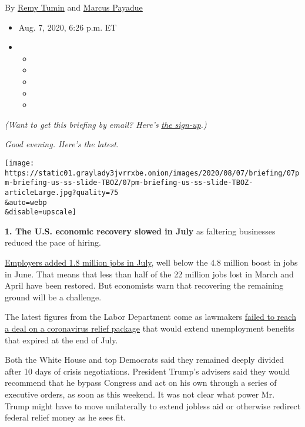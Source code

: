 By \href{https://www.nytimes3xbfgragh.onion/by/remy-tumin}{Remy Tumin}
and \href{https://www.nytimes3xbfgragh.onion/by/marcus-payadue}{Marcus
Payadue}

\begin{itemize}
\item
  Aug. 7, 2020, 6:26 p.m. ET
\item
  \begin{itemize}
  \item
  \item
  \item
  \item
  \item
  \end{itemize}
\end{itemize}

\emph{(Want to get this briefing by email? Here's}
\href{http://www.nytimes3xbfgragh.onion/newsletters/nyt-now-evening-briefing?module=inline}{\emph{the
sign-up}}\emph{.)}

\emph{Good evening. Here's the latest.}

\texttt{[image: https://static01.graylady3jvrrxbe.onion/images/2020/08/07/briefing/07pm-briefing-us-ss-slide-TBOZ/07pm-briefing-us-ss-slide-TBOZ-articleLarge.jpg?quality=75\\\&auto=webp\\\&disable=upscale]}

\textbf{1. The U.S. economic recovery slowed in July} as faltering
businesses reduced the pace of hiring.

\href{https://www.nytimes3xbfgragh.onion/live/2020/08/07/business/stock-market-today-coronavirus/us-employers-added-1-8-million-jobs-in-july-despite-a-coronavirus-surge}{Employers
added 1.8 million jobs in July}, well below the 4.8 million boost in
jobs in June. That means that less than half of the 22 million jobs lost
in March and April have been restored. But economists warn that
recovering the remaining ground will be a challenge.

The latest figures from the Labor Department come as lawmakers
\href{https://www.nytimes3xbfgragh.onion/2020/08/07/world/covid-19-news.html?\#link-232a7bee}{failed
to reach a deal on a coronavirus relief package} that would extend
unemployment benefits that expired at the end of July.

Both the White House and top Democrats said they remained deeply divided
after 10 days of crisis negotiations. President Trump's advisers said
they would recommend that he bypass Congress and act on his own through
a series of executive orders, as soon as this weekend. It was not clear
what power Mr. Trump might have to move unilaterally to extend jobless
aid or otherwise redirect federal relief money as he sees fit.

